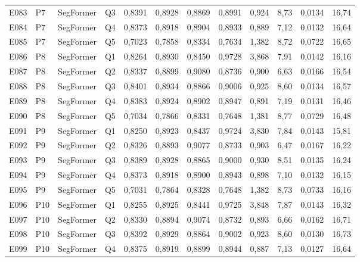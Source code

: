 \begin{longtable}{lllllccccccc}
E083 & P7 & SegFormer & Q3 & 0{,}8391 & 0{,}8928 & 0{,}8869 & 0{,}8991 & 0{,}924 & 8{,}73 & 0{,}0134 & 16{,}74 \\
E084 & P7 & SegFormer & Q4 & 0{,}8373 & 0{,}8918 & 0{,}8904 & 0{,}8933 & 0{,}889 & 7{,}12 & 0{,}0132 & 16{,}64 \\
E085 & P7 & SegFormer & Q5 & 0{,}7023 & 0{,}7858 & 0{,}8334 & 0{,}7634 & 1{,}382 & 8{,}72 & 0{,}0722 & 16{,}65 \\
E086 & P8 & SegFormer & Q1 & 0{,}8264 & 0{,}8930 & 0{,}8450 & 0{,}9728 & 3{,}868 & 7{,}91 & 0{,}0142 & 16{,}16 \\
E087 & P8 & SegFormer & Q2 & 0{,}8337 & 0{,}8899 & 0{,}9080 & 0{,}8736 & 0{,}900 & 6{,}63 & 0{,}0166 & 16{,}54 \\
E088 & P8 & SegFormer & Q3 & 0{,}8401 & 0{,}8934 & 0{,}8866 & 0{,}9006 & 0{,}925 & 8{,}60 & 0{,}0134 & 16{,}57 \\
E089 & P8 & SegFormer & Q4 & 0{,}8383 & 0{,}8924 & 0{,}8902 & 0{,}8947 & 0{,}891 & 7{,}19 & 0{,}0131 & 16{,}46 \\
E090 & P8 & SegFormer & Q5 & 0{,}7034 & 0{,}7866 & 0{,}8331 & 0{,}7648 & 1{,}381 & 8{,}77 & 0{,}0729 & 16{,}48 \\
E091 & P9 & SegFormer & Q1 & 0{,}8250 & 0{,}8923 & 0{,}8437 & 0{,}9724 & 3{,}830 & 7{,}84 & 0{,}0143 & 15{,}81 \\
E092 & P9 & SegFormer & Q2 & 0{,}8326 & 0{,}8893 & 0{,}9077 & 0{,}8733 & 0{,}903 & 6{,}47 & 0{,}0167 & 16{,}22 \\
E093 & P9 & SegFormer & Q3 & 0{,}8389 & 0{,}8928 & 0{,}8865 & 0{,}9000 & 0{,}930 & 8{,}51 & 0{,}0135 & 16{,}24 \\
E094 & P9 & SegFormer & Q4 & 0{,}8373 & 0{,}8918 & 0{,}8900 & 0{,}8943 & 0{,}898 & 7{,}10 & 0{,}0132 & 16{,}15 \\
E095 & P9 & SegFormer & Q5 & 0{,}7031 & 0{,}7864 & 0{,}8328 & 0{,}7648 & 1{,}382 & 8{,}73 & 0{,}0733 & 16{,}16 \\
E096 & P10 & SegFormer & Q1 & 0{,}8255 & 0{,}8925 & 0{,}8441 & 0{,}9725 & 3{,}848 & 7{,}87 & 0{,}0143 & 16{,}32 \\
E097 & P10 & SegFormer & Q2 & 0{,}8330 & 0{,}8894 & 0{,}9074 & 0{,}8732 & 0{,}893 & 6{,}66 & 0{,}0162 & 16{,}71 \\
E098 & P10 & SegFormer & Q3 & 0{,}8392 & 0{,}8929 & 0{,}8864 & 0{,}9002 & 0{,}923 & 8{,}60 & 0{,}0130 & 16{,}73 \\
E099 & P10 & SegFormer & Q4 & 0{,}8375 & 0{,}8919 & 0{,}8899 & 0{,}8944 & 0{,}887 & 7{,}13 & 0{,}0127 & 16{,}64 \\

\end{longtable}
